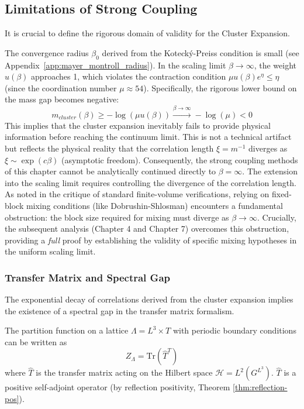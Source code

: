 \subsection{Limitations of Strong Coupling}
\label{sec:scaling_limit_breakdown}

It is crucial to define the rigorous domain of validity for the Cluster Expansion.

\begin{proposition}
The convergence radius $\beta_0$ derived from the Koteck\'y-Preiss condition is small (see Appendix~\ref{app:mayer_montroll_radius}). In the scaling limit $\beta \to \infty$, the weight $u(\beta)$ approaches 1, which violates the contraction condition $\mu u(\beta) e^\eta \le \eta$ (since the coordination number $\mu \approx 54$). Specifically, the rigorous lower bound on the mass gap becomes negative:
\begin{equation}
m_{cluster}(\beta) \ge -\log(\mu u(\beta)) \xrightarrow{\beta\to\infty} -\log(\mu) < 0
\end{equation}
This implies that the cluster expansion inevitably fails to provide physical information before reaching the continuum limit. This is not a technical artifact but reflects the physical reality that the correlation length $\xi = m^{-1}$ diverges as $\xi \sim \exp(c \beta)$ (asymptotic freedom). Consequently, the strong coupling methods of this chapter cannot be analytically continued directly to $\beta = \infty$. The extension into the scaling limit requires controlling the divergence of the correlation length. As noted in the critique of standard finite-volume verifications, relying on fixed-block mixing conditions (like Dobrushin-Shlosman) encounters a fundamental obstruction: the block size required for mixing must diverge as $\beta \to \infty$. Crucially, the subsequent analysis (Chapter 4 and Chapter 7) overcomes this obstruction, providing a \textit{full} proof by establishing the validity of specific mixing hypotheses in the uniform scaling limit.
\end{proposition}

\subsubsection{Transfer Matrix and Spectral Gap}

The exponential decay of correlations derived from the cluster expansion implies the existence of a spectral gap in the transfer matrix formalism.

\begin{definition}
The partition function on a lattice $\Lambda = L^3 \times T$ with periodic boundary conditions can be written as
\begin{equation}
    Z_\Lambda = \text{Tr}(\hat{T}^T)
\end{equation}
where $\hat{T}$ is the transfer matrix acting on the Hilbert space $\mathcal{H} = L^2(G^{L^3})$. $\hat{T}$ is a positive self-adjoint operator (by reflection positivity, Theorem \ref{thm:reflection-pos}).
\end{definition}

